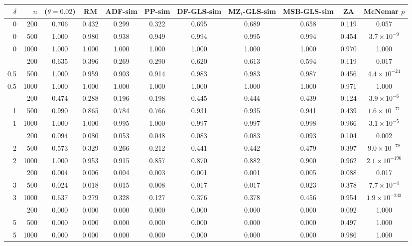\begin{tabular}{r r c c c c c c c c c }
\toprule
$\delta$ & $n$ & \RMGLS{} ($\theta = 0.02$) & RM & ADF-sim & PP-sim & DF-GLS-sim & MZ$_t$-GLS-sim & MSB-GLS-sim & ZA & McNemar $p$ \\
\midrule
0 & 200 & 0.706 & 0.432 & 0.299 & 0.322 & 0.695 & 0.689 & 0.658 & 0.119 & 0.057 \\
0 & 500 & 1.000 & 0.980 & 0.938 & 0.949 & 0.994 & 0.995 & 0.994 & 0.454 & $3.7\times10^{-9}$ \\
0 & 1000 & 1.000 & 1.000 & 1.000 & 1.000 & 1.000 & 1.000 & 1.000 & 0.970 & 1.000 \\
\addlinespace
0.5 & 200 & 0.635 & 0.396 & 0.269 & 0.290 & 0.620 & 0.613 & 0.594 & 0.119 & 0.017 \\
0.5 & 500 & 1.000 & 0.959 & 0.903 & 0.914 & 0.983 & 0.983 & 0.987 & 0.456 & $4.4\times10^{-24}$ \\
0.5 & 1000 & 1.000 & 1.000 & 1.000 & 1.000 & 1.000 & 1.000 & 1.000 & 0.971 & 1.000 \\
\addlinespace
1 & 200 & 0.474 & 0.288 & 0.196 & 0.198 & 0.445 & 0.444 & 0.439 & 0.124 & $3.9\times10^{-6}$ \\
1 & 500 & 0.990 & 0.865 & 0.784 & 0.766 & 0.931 & 0.935 & 0.941 & 0.439 & $1.6\times10^{-71}$ \\
1 & 1000 & 1.000 & 1.000 & 0.995 & 1.000 & 0.997 & 0.997 & 0.998 & 0.966 & $3.1\times10^{-5}$ \\
\addlinespace
2 & 200 & 0.094 & 0.080 & 0.053 & 0.048 & 0.083 & 0.083 & 0.093 & 0.104 & 0.002 \\
2 & 500 & 0.573 & 0.329 & 0.266 & 0.212 & 0.441 & 0.442 & 0.479 & 0.397 & $9.0\times10^{-78}$ \\
2 & 1000 & 1.000 & 0.953 & 0.915 & 0.857 & 0.870 & 0.882 & 0.900 & 0.962 & $2.1\times10^{-196}$ \\
\addlinespace
3 & 200 & 0.004 & 0.006 & 0.004 & 0.003 & 0.001 & 0.001 & 0.005 & 0.088 & 0.017 \\
3 & 500 & 0.024 & 0.018 & 0.015 & 0.008 & 0.017 & 0.017 & 0.023 & 0.378 & $7.7\times10^{-4}$ \\
3 & 1000 & 0.637 & 0.279 & 0.328 & 0.127 & 0.376 & 0.378 & 0.456 & 0.954 & $1.9\times10^{-233}$ \\
\addlinespace
5 & 200 & 0.000 & 0.000 & 0.000 & 0.000 & 0.000 & 0.000 & 0.000 & 0.092 & 1.000 \\
5 & 500 & 0.000 & 0.000 & 0.000 & 0.000 & 0.000 & 0.000 & 0.000 & 0.497 & 1.000 \\
5 & 1000 & 0.000 & 0.000 & 0.000 & 0.000 & 0.000 & 0.000 & 0.000 & 0.986 & 1.000 \\
\bottomrule
\end{tabular}
